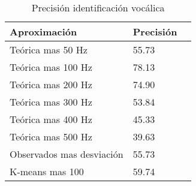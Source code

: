 \begin{table}[H]
\centering
\caption{Precisión identificación vocálica}
\label{tab:resultados_vocales}
\begin{tabular}{|l|l|l|}
Aproximación & Precisión \\ \hline
Teórica mas 50 Hz & 55.73 \\ \hline
Teórica mas 100 Hz & 78.13 \\ \hline
Teórica mas 200 Hz & 74.90 \\ \hline
Teórica mas 300 Hz & 53.84 \\ \hline
Teórica mas 400 Hz & 45.33 \\ \hline
Teórica mas 500 Hz & 39.63 \\ \hline
Observados mas desviación & 55.73 \\ \hline
K-means mas 100 & 59.74 \\ \hline
\end{tabular}

\end{table}